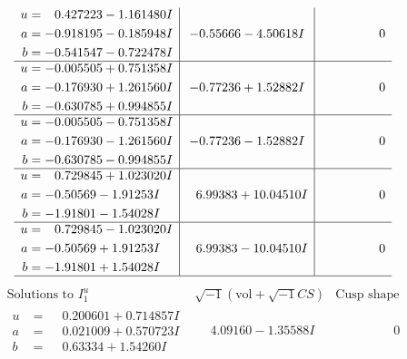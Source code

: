 \documentclass[1p]{elsarticle_modified}
\theoremstyle{definition}
\newcommand{\I}{\sqrt{-1}}
\begin{document}
$$\begin{array}{c|c|c}
\begin{aligned}
u &= \phantom{-}0.427223 - 1.161480 I \\
a &= -0.918195 - 0.185948 I \\
b &= -0.541547 - 0.722478 I\end{aligned}
 & -0.55666 - 4.50618 I & \phantom{-0.000000 } 0 \\ \hline\begin{aligned}
u &= -0.005505 + 0.751358 I \\
a &= -0.176930 + 1.261560 I \\
b &= -0.630785 + 0.994855 I\end{aligned}
 & -0.77236 + 1.52882 I & \phantom{-0.000000 } 0 \\ \hline\begin{aligned}
u &= -0.005505 - 0.751358 I \\
a &= -0.176930 - 1.261560 I \\
b &= -0.630785 - 0.994855 I\end{aligned}
 & -0.77236 - 1.52882 I & \phantom{-0.000000 } 0 \\ \hline\begin{aligned}
u &= \phantom{-}0.729845 + 1.023020 I \\
a &= -0.50569 - 1.91253 I \\
b &= -1.91801 - 1.54028 I\end{aligned}
 & \phantom{-}6.99383 + 10.04510 I & \phantom{-0.000000 } 0 \\ \hline\begin{aligned}
u &= \phantom{-}0.729845 - 1.023020 I \\
a &= -0.50569 + 1.91253 I \\
b &= -1.91801 + 1.54028 I\end{aligned}
 & \phantom{-}6.99383 - 10.04510 I & \phantom{-0.000000 } 0\\
 \hline 
 \end{array}$$\newpage$$\begin{array}{c|c|c}  
\text{Solutions to }I^u_{1}& \I (\text{vol} + \sqrt{-1}CS) & \text{Cusp shape}\\
 \hline 
\begin{aligned}
u &= \phantom{-}0.200601 + 0.714857 I \\
a &= \phantom{-}0.021009 + 0.570723 I \\
b &= \phantom{-}0.63334 + 1.54260 I\end{aligned}
 & \phantom{-}4.09160 - 1.35588 I & \phantom{-0.000000 } 0 \\ \hline\begin{aligned}

\end{aligned}
\end{array}$$
\end{document}
